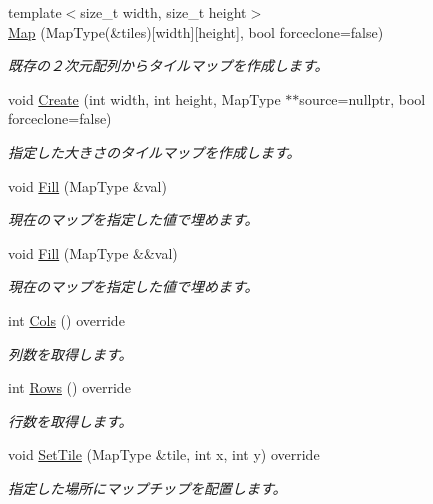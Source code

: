 \begin{DoxyCompactItemize}
\item 
{\footnotesize template$<$size\+\_\+t width, size\+\_\+t height$>$ }\\\hyperlink{class_map_ae6696f8eaad102abae658cd8af41cb46}{Map} (Map\+Type(\&tiles)\mbox{[}width\mbox{]}\mbox{[}height\mbox{]}, bool forceclone=false)
\begin{DoxyCompactList}\small\item\em 既存の２次元配列からタイルマップを作成します。\end{DoxyCompactList}\item 
void \hyperlink{class_map_a17408881d7e39d5e4ebd2ad5ea3c6034}{Create} (int width, int height, Map\+Type $\ast$$\ast$source=nullptr, bool forceclone=false)
\begin{DoxyCompactList}\small\item\em 指定した大きさのタイルマップを作成します。\end{DoxyCompactList}\item 
void \hyperlink{class_map_aac3da2d34501dedf52ec6d48c9662111}{Fill} (Map\+Type \&val)
\begin{DoxyCompactList}\small\item\em 現在のマップを指定した値で埋めます。\end{DoxyCompactList}\item 
void \hyperlink{class_map_ae92787109f1e8e90a387f2900c3ccd59}{Fill} (Map\+Type \&\&val)
\begin{DoxyCompactList}\small\item\em 現在のマップを指定した値で埋めます。\end{DoxyCompactList}\item 
int \hyperlink{class_map_af83f6e34a7847c4083f8c9771343a07b}{Cols} () override
\begin{DoxyCompactList}\small\item\em 列数を取得します。\end{DoxyCompactList}\item 
int \hyperlink{class_map_a5636f15af5669a481744deb7ea297ef3}{Rows} () override
\begin{DoxyCompactList}\small\item\em 行数を取得します。\end{DoxyCompactList}\item 
void \hyperlink{class_map_a1710dc141f0ffecd0f6cd10f934b490f}{Set\+Tile} (Map\+Type \&tile, int x, int y) override
\begin{DoxyCompactList}\small\item\em 指定した場所にマップチップを配置します。\end{DoxyCompactList}\item 
$$
\end{DoxyCompactItemize}
